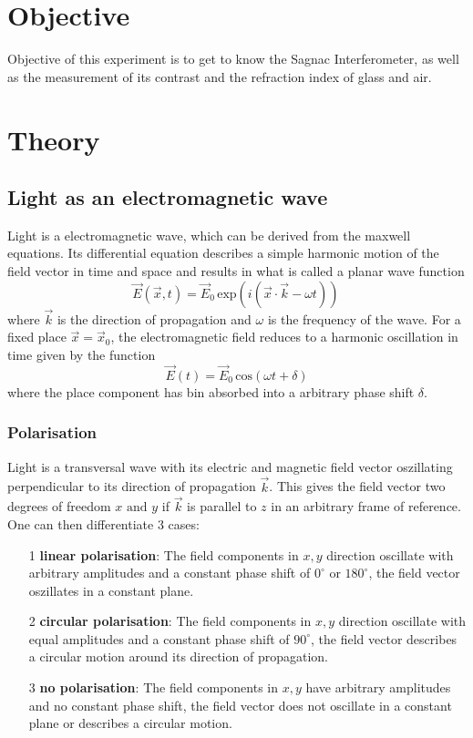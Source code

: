 \section{Objective}
\label{sec:Zielsetzung}
    Objective of this experiment is to get to know the Sagnac Interferometer, as well as the measurement of its contrast and the refraction index of glass and air.
\section{Theory}
\label{sec:Theorie}
\subsection{Light as an electromagnetic wave}
Light is a electromagnetic wave, which can be derived from the maxwell equations. Its differential equation describes a simple harmonic motion of the field vector in time and space and results in 
what is called a planar wave function
\begin{equation}
    \vec{E}\left(\vec{x}, t\right) = \vec{E}_0 \, \text{exp} \left(i \left(\vec{x} \cdot \vec{k} - \omega t\right)\right) \, 
\end{equation}
where $\vec{k}$ is the direction of propagation and $\omega$ is the frequency of the wave.
For a fixed place $\vec{x} = \vec{x}_0$, the electromagnetic field reduces to a harmonic oscillation in time given by the function
\begin{equation}
    \vec{E}\left( t\right) = \vec{E}_0 \, \text{cos} \left(\omega t + \delta\right)
\end{equation}
where the place component has bin absorbed into a arbitrary phase shift $\delta$.
\subsubsection{Polarisation}
Light is a transversal wave with its electric and magnetic field vector oszillating perpendicular to its direction of propagation $\vec{k}$. This gives the field vector two degrees of freedom $x \text{ and } y$ if $\vec{k}$ is parallel to $z$ in an arbitrary frame of reference.
One can then differentiate 3 cases:
\begin{itemize}
    \item[1] \textbf{linear polarisation}: The field components in $x,y$ direction oscillate with arbitrary amplitudes and a constant phase shift of $0^\circ$ or $180^\circ$, the field vector oszillates in a constant plane.
    \item[2] \textbf{circular polarisation}: The field components in $x, y$ direction oscillate with equal amplitudes and a constant phase shift of $90^\circ$, the field vector describes a circular motion around its direction of propagation.
    \item[3] \textbf{no polarisation}: The field components in $x,y$ have arbitrary amplitudes and no constant phase shift, the field vector does not oscillate in a constant plane or describes a circular motion.
\end{itemize}


